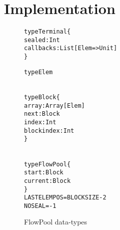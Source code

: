 \documentclass[runningheads,a4paper]{llncs}
\begin{document}
\section{Implementation}


\begin{figure}[t]

\centering

\begin{minipage}[b]{4.5 cm}
\begin{alltt}
{\scriptsize
type Terminal \{
  sealed: Int
  callbacks: List[Elem => Unit]
\}

type Elem
}
\end{alltt}
\end{minipage}
\begin{minipage}[b]{3.5 cm}
\begin{alltt}
{\scriptsize
type Block \{
  array: Array[Elem]
  next: Block
  index: Int
  blockindex: Int
\}
}
\end{alltt}
\end{minipage}
\begin{minipage}[b]{4 cm}
\begin{alltt}
{\scriptsize
type FlowPool \{
  start: Block
  current: Block
\}
LASTELEMPOS = BLOCKSIZE - 2
NOSEAL = -1
}
\end{alltt}
\end{minipage}

\caption{FlowPool data-types}
\label{f-datatypes}
\end{figure}


\setlength\linenumbersep{2pt}
\end{document}
